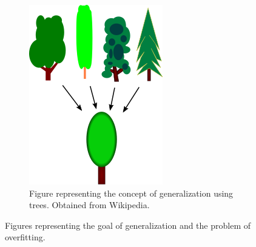\begin{figure}[ht]
\hfill
\begin{subfigure}[b]{0.24\textwidth}
\centering
\includegraphics[width=\textwidth]{GeneralizationTreesWikipedia}
\caption{Figure representing the concept of generalization using trees. Obtained from Wikipedia.}\label{fig:GeneralizationTreesWikipedia}
\end{subfigure}
\caption{Figures representing the goal of generalization and the problem of overfitting.}
\end{figure}

